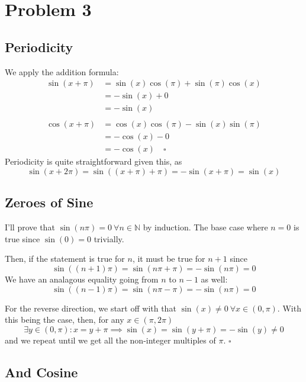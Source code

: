 \documentclass[12pt]{article}
\newcommand{\N}{\mathbb{N}}
\begin{document}
\setcounter{section}{2}

\section{Problem 3}

\subsection{Periodicity}\label{sec:p3p1}

We apply the addition formula:
\begin{align*}
  \sin(x+\pi)
   & = \sin(x)\cos(\pi) + \sin(\pi)\cos(x) \\
   & = -\sin(x) + 0                        \\
   & = -\sin(x)                            \\ \\
  \cos(x+\pi)
   & = \cos(x)\cos(\pi)-\sin(x)\sin(\pi)   \\
   & = -\cos(x) - 0                        \\
   & = -\cos(x)\quad\square
\end{align*}
Periodicity is quite straightforward given this, as
\[\sin(x+2\pi)=\sin((x+\pi)+\pi)=-\sin(x+\pi)=\sin(x)\]

\subsection{Zeroes of Sine}

I'll prove that $\sin(n\pi)=0\ \forall n \in \N$ by induction.
The base case where $n=0$ is true since $\sin(0)=0$ trivially.

Then, if the statement is true for $n$, it must be true for $n+1$ since
\[\sin((n+1)\pi)=\sin(n\pi+\pi)=-\sin(n\pi)=0\]
We have an analagous equality going from $n$ to $n-1$ as well:
\[\sin((n-1)\pi)=\sin(n\pi-\pi)=-\sin(n\pi)=0\]

For the reverse direction, we start off with that $\sin(x) \ne 0\ \forall x \in (0, \pi)$.
With this being the case, then, for any $x \in (\pi, 2\pi)$
\[\exists y \in (0, \pi): x=y+\pi \implies \sin(x)=\sin(y+\pi)=-\sin(y) \ne 0\]
and we repeat until we get all the non-integer multiples of $\pi$. $\square$

\pagebreak

\subsection{And Cosine}\label{sec:p3p3}
\end{document}
